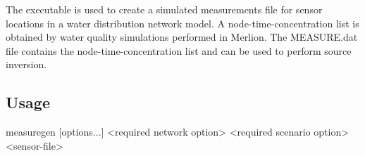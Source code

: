 The  executable is used to create a simulated measurements file 
for sensor locations in a water distribution network model. 
A node-time-concentration list is obtained by water quality simulations performed in Merlion.
The MEASURE.dat file contains the node-time-concentration list and can be used to perform source inversion. 

\subsection{Usage}\label{measuregenUsage}
\begin{unknownListing}
   measuregen [options...] <required network option> <required scenario option> <sensor-file> 
\end{unknownListing}

